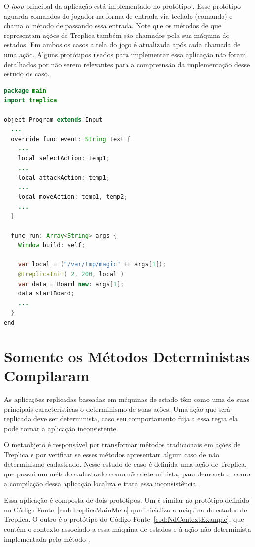 O \emph{loop} principal da aplicação está implementado no protótipo . Esse protótipo aguarda comandos do jogador na forma de entrada via teclado (comando) e chama o método  de  passando essa entrada. Note que os métodos de  que representam ações de Treplica também são chamados pela sua máquina de estados. Em ambos os casos a tela do jogo é atualizada após cada chamada de uma ação. Alguns protótipos usados para implementar essa aplicação não foram detalhados por não serem relevantes para a compreensão da implementação desse estudo de caso.

\begin{lstlisting}[language=Java, caption={Protótipo \textbf{Program} do Jogo de Tabuleiro}, label={cod:RogueProgMain}]
package main
import treplica

object Program extends Input
  ...
  override func event: String text {
    ...
    local selectAction: temp1;
    ...
    local attackAction: temp1;
    ...
    local moveAction: temp1, temp2;
    ...
  }

  func run: Array<String> args {
    Window build: self;
    
    var local = ("/var/tmp/magic" ++ args[1]);
    @treplicaInit( 2, 200, local )
    var data = Board new: args[1];
    data startBoard;
    ...
  }
end
\end{lstlisting}

\section{Somente os Métodos Deterministas Compilaram}
\label{sec:estudodtcomp}

As aplicações replicadas baseadas em máquinas de estado têm como uma de suas principais características o determinismo de suas ações. Uma ação que será replicada deve ser determinista, caso seu comportamento fuja a essa regra ela pode tornar a aplicação inconsistente.

O metaobjeto  é responsável por transformar métodos tradicionais em ações de Treplica e por verificar se esses métodos apresentam algum caso de não determinismo cadastrado. Nesse estudo de caso é definida uma ação de Treplica, que possui um método cadastrado como não determinista, para demonstrar como a compilação dessa aplicação localiza e trata essa inconsistência.

Essa aplicação é composta de dois protótipos. Um é similar ao protótipo definido no Código-Fonte~\ref{cod:TreplicaMainMeta} que inicializa a máquina de estados de Treplica. O outro é o protótipo do Código-Fonte~\ref{cod:NdContextExample}, que contém o contexto associado a essa máquina de estados e à ação não determinista implementada pelo método .

